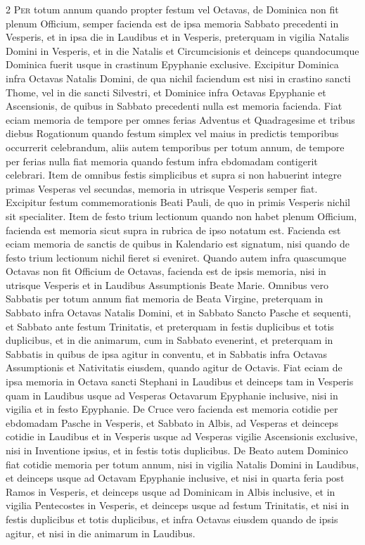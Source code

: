 \begin{multicols*}{2}
{\color{Red} }
\lettrine[lines=2]{\zallmancaps \color{Red} P}{er} totum annum quando propter festum vel Octavas, de Dominica non fit plenum Officium, semper facienda est de ipsa memoria Sabbato precedenti in Vesperis, et in ipsa die in Laudibus et in Vesperis, preterquam in vigilia Natalis Domini in Vesperis, et in die Natalis et Circumcisionis et deinceps quandocumque Dominica fuerit usque in crastinum Epyphanie exclusive. Excipitur Dominica infra Octavas Natalis Domini, de qua nichil faciendum est nisi in crastino sancti Thome, vel in die sancti Silvestri, et Dominice infra Octavas Epyphanie et Ascensionis, de quibus in Sabbato precedenti nulla est memoria facienda.
Fiat eciam memoria de tempore per omnes ferias
Adventus et Quadragesime et tribus diebus Rogationum quando festum simplex vel maius in predictis temporibus occurrerit celebrandum, aliis autem temporibus per totum annum, de tempore per ferias nulla fiat memoria quando festum infra ebdomadam contigerit celebrari.
Item de omnibus festis simplicibus et supra si non habuerint integre primas Vesperas vel secundas, memoria in utrisque Vesperis semper fiat. Excipitur festum commemorationis Beati Pauli, de quo in primis Vesperis nichil sit specialiter. Item de festo trium lectionum quando non habet plenum Officium, facienda est memoria sicut supra in rubrica de ipso notatum est.
Facienda est eciam memoria de sanctis de quibus in Kalendario est signatum, nisi quando de festo trium lectionum nichil fieret si eveniret. Quando autem infra quascumque Octavas non fit Officium de Octavas, facienda est de ipsis memoria, nisi in utrisque Vesperis et in Laudibus Assumptionis Beate Marie.
Omnibus vero Sabbatis per totum annum fiat memoria de Beata Virgine, preterquam in Sabbato infra Octavas Natalis Domini, et in Sabbato Sancto Pasche et sequenti, et Sabbato ante festum Trinitatis, et preterquam in festis duplicibus et totis duplicibus, et in die animarum, cum in Sabbato evenerint, et preterquam in Sabbatis in quibus de ipsa agitur in conventu, et in Sabbatis infra Octavas Assumptionis et Nativitatis eiusdem, quando agitur de Octavis.
Fiat eciam de ipsa memoria in Octava sancti Stephani in Laudibus et deinceps tam in Vesperis quam in Laudibus usque ad Vesperas Octavarum Epyphanie inclusive, nisi in vigilia et in festo Epyphanie.
De Cruce vero facienda est memoria cotidie per ebdomadam Pasche in Vesperis, et Sabbato in Albis, ad Vesperas et deinceps cotidie in Laudibus et in Vesperis usque ad Vesperas vigilie Ascensionis exclusive, nisi in Inventione ipsius, et in festis totis duplicibus.
De Beato autem Dominico fiat cotidie memoria per totum annum, nisi in vigilia Natalis Domini in Laudibus, et deinceps usque ad Octavam Epyphanie inclusive, et nisi in quarta feria post Ramos in Vesperis, et deinceps usque ad Dominicam in Albis inclusive, et in vigilia Pentecostes in Vesperis, et deinceps usque ad festum Trinitatis, et nisi in festis duplicibus et totis duplicibus, et infra Octavas eiusdem quando de ipsis agitur, et nisi in die animarum in Laudibus.


\end{multicols*}
